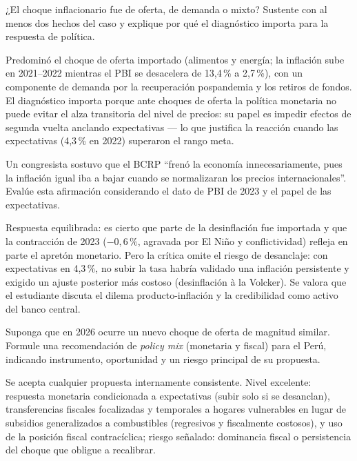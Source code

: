 \documentclass{evaluacion}
\begin{document}
\begin{pregunta}[5][Diagnóstico]
¿El choque inflacionario fue de oferta, de demanda o mixto? Sustente con
al menos dos hechos del caso y explique por qué el diagnóstico importa
para la respuesta de política.
\begin{solucion}
Predominó el choque de oferta importado (alimentos y energía; la
inflación sube en 2021--2022 mientras el PBI se desacelera de 13,4\,\% a
2,7\,\%), con un componente de demanda por la recuperación pospandemia y
los retiros de fondos. El diagnóstico importa porque ante choques de
oferta la política monetaria no puede evitar el alza transitoria del
nivel de precios: su papel es impedir efectos de segunda vuelta anclando
expectativas — lo que justifica la reacción cuando las expectativas
(4,3\,\% en 2022) superaron el rango meta.
\end{solucion}
\end{pregunta}

\begin{pregunta}
Un congresista sostuvo que el BCRP \enquote{frenó la economía
innecesariamente, pues la inflación igual iba a bajar cuando se
normalizaran los precios internacionales}. Evalúe esta afirmación
considerando el dato de PBI de 2023 y el papel de las expectativas.
\begin{solucion}
Respuesta equilibrada: es cierto que parte de la desinflación fue
importada y que la contracción de 2023 ($-0{,}6\,\%$, agravada por El
Niño y conflictividad) refleja en parte el apretón monetario. Pero la
crítica omite el riesgo de desanclaje: con expectativas en 4,3\,\%, no
subir la tasa habría validado una inflación persistente y exigido un
ajuste posterior más costoso (desinflación à la Volcker). Se valora que
el estudiante discuta el dilema producto-inflación y la credibilidad
como activo del banco central.
\end{solucion}
\end{pregunta}

\begin{pregunta}[5][Propuesta]
Suponga que en 2026 ocurre un nuevo choque de oferta de magnitud similar.
Formule una recomendación de \emph{policy mix} (monetaria y fiscal) para
el Perú, indicando instrumento, oportunidad y un riesgo principal de su
propuesta.
\begin{solucion}
Se acepta cualquier propuesta internamente consistente. Nivel excelente:
respuesta monetaria condicionada a expectativas (subir solo si se
desanclan), transferencias fiscales focalizadas y temporales a hogares
vulnerables en lugar de subsidios generalizados a combustibles
(regresivos y fiscalmente costosos), y uso de la posición fiscal
contracíclica; riesgo señalado: dominancia fiscal o persistencia del
choque que obligue a recalibrar.
\end{solucion}
\end{pregunta}

\findelexamen
\end{document}
